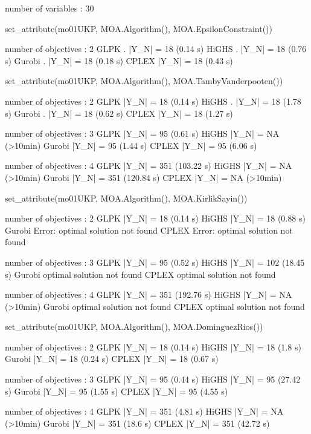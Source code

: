 number of variables  : 30

set_attribute(mo01UKP, MOA.Algorithm(), MOA.EpsilonConstraint())

number of objectives : 2   
GLPK .    |Y_N|  = 18 (0.14 s)
HiGHS .    |Y_N|  = 18 (0.76 s)
Gurobi .    |Y_N|  = 18 (0.18 s)
CPLEX     |Y_N|  = 18 (0.43 s)
  
  
set_attribute(mo01UKP, MOA.Algorithm(), MOA.TambyVanderpooten())

number of objectives : 2    
GLPK        |Y_N|  = 18 (0.14 s)
HiGHS .    |Y_N|  = 18 (1.78 s)
Gurobi .    |Y_N|  = 18 (0.62 s)
CPLEX     |Y_N|  = 18 (1.27 s)

number of objectives : 3
GLPK      |Y_N|  = 95 (0.61 s)
HiGHS    |Y_N|  = NA (>10min)
Gurobi    |Y_N|  = 95 (1.44 s)
CPLEX    |Y_N|  = 95 (6.06 s)
    
number of objectives : 4
GLPK    |Y_N|  = 351 (103.22 s)
HiGHS    |Y_N|  = NA (>10min)
Gurobi    |Y_N|  = 351 (120.84 s)
CPLEX    |Y_N|  = NA (>10min)
  
  
set_attribute(mo01UKP, MOA.Algorithm(), MOA.KirlikSayin())

number of objectives : 2      
GLPK    |Y_N|  = 18 (0.14 s)
HiGHS    |Y_N|  = 18 (0.88 s)
Gurobi   Error: optimal solution not found
CPLEX   Error: optimal solution not found

number of objectives : 3
GLPK    |Y_N|  = 95 (0.52 s)
HiGHS     |Y_N|  = 102 (18.45 s)
Gurobi   optimal solution not found
CPLEX   optimal solution not found
  
number of objectives : 4
GLPK     |Y_N|  = 351 (192.76 s)
HiGHS    |Y_N|  = NA (>10min)
Gurobi   optimal solution not found
CPLEX    optimal solution not found 


set_attribute(mo01UKP, MOA.Algorithm(), MOA.DominguezRios())

number of objectives : 2      
GLPK       |Y_N|  = 18 (0.14 s)
HiGHS      |Y_N|  = 18 (1.8 s)
Gurobi      |Y_N|  = 18 (0.24 s)
CPLEX      |Y_N|  = 18 (0.67 s)

number of objectives : 3      
GLPK      |Y_N|  = 95 (0.44 s)
HiGHS      |Y_N|  = 95 (27.42 s)
Gurobi      |Y_N|  = 95 (1.55 s)
CPLEX      |Y_N|  = 95 (4.55 s)

number of objectives : 4      
GLPK      |Y_N|  = 351 (4.81 s)
HiGHS    |Y_N|  = NA (>10min)
Gurobi     |Y_N|  = 351 (18.6 s)
CPLEX     |Y_N|  = 351 (42.72 s)


